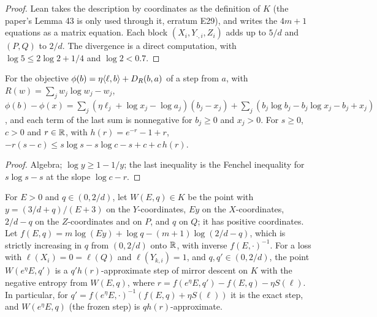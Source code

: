 \begin{proof}
  \leanok
  Lean takes the description by coordinates as the definition of $K$ (the paper's Lemma 43 is only
  used through it, erratum E29), and writes the $4m + 1$ equations as a matrix equation. Each block
  $(X_i, Y_{\cdot,i}, Z_i)$ adds up to $5/d$ and $(P, Q)$ to $2/d$. The divergence is a direct
  computation, with $\log 5 \le 2\log 2 + 1/4$ and $\log 2 < 0.7$.
\end{proof}

\begin{lemma}
  \label{lem:polytope_lower_gap}
  \leanok
  For the objective $\phi(b) = \eta\langle \ell, b \rangle + D_R(b, a)$ of a step from $a$, with
  $R(w) = \sum_j w_j\log w_j - w_j$,
  $\phi(b) - \phi(x) = \sum_j(\eta\ell_j + \log x_j - \log a_j)(b_j - x_j)
  + \sum_j(b_j\log b_j - b_j\log x_j - b_j + x_j)$, and each term of the last sum is nonnegative for
  $b_j \ge 0$ and $x_j > 0$. For $s \ge 0$, $c > 0$ and $r \in \mathbb{R}$, with $h(r) = e^{-r} - 1 + r$,
  $-r(s - c) \le s\log s - s\log c - s + c + c\,h(r)$.
\end{lemma}

\begin{proof}
  \leanok
  Algebra; $\log y \ge 1 - 1/y$; the last inequality is the Fenchel inequality for $s\log s - s$
  at the slope $\log c - r$.
\end{proof}

\begin{lemma}
  \label{lem:polytope_lower_curve_step}
  \leanok
  For $E > 0$ and $q \in (0, 2/d)$, let $W(E, q) \in K$ be the point with $y = (3/d + q)/(E + 3)$ on
  the $Y$-coordinates, $Ey$ on the $X$-coordinates, $2/d - q$ on the $Z$-coordinates and on $P$, and
  $q$ on $Q$; it has positive coordinates. Let
  $f(E, q) = m\log(Ey) + \log q - (m + 1)\log(2/d - q)$, which is strictly increasing in $q$ from
  $(0, 2/d)$ onto $\mathbb{R}$, with inverse $f(E, \cdot)^{-1}$. For a loss with $\ell(X_i) = 0 = \ell(Q)$
  and $\ell(Y_{k,i}) = 1$, and $q, q' \in (0, 2/d)$, the point $W(e^\eta E, q')$ is a
  $q'h(r)$-approximate step of mirror descent on $K$ with the negative entropy from $W(E, q)$, where
  $r = f(e^\eta E, q') - f(E, q) - \eta S(\ell)$. In particular, for
  $q' = f(e^\eta E, \cdot)^{-1}(f(E, q) + \eta S(\ell))$ it is the exact step, and $W(e^\eta E, q)$
  (the frozen step) is $q h(r)$-approximate.
\end{lemma}

